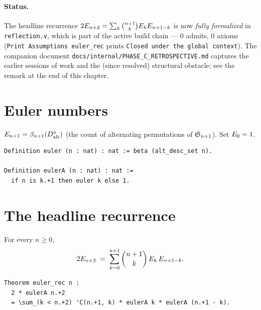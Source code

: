 \paragraph{Status.} The headline recurrence $2 E_{n+2} = \sum_k
\binom{n+1}{k} E_k E_{n+1-k}$ is now \emph{fully formalized}
in \texttt{reflection.v}, which is part of the active build chain
--- 0 admits, 0 axioms (\texttt{Print Assumptions euler\_rec}
prints \texttt{Closed under the global context}). The companion
document \texttt{docs/internal/PHASE\_C\_RETROSPECTIVE.md} captures
the earlier sessions of work and the (since resolved) structural
obstacle; see the remark at the end of this chapter.

\section{Euler numbers}

\begin{definition}
  $E_{n+1} = \beta_{n+1}(D_{\mathrm{alt}}^n)$ (the count of
  alternating permutations of $\mathfrak{S}_{n+1}$). Set $E_0 = 1$.
\end{definition}

\begin{lstlisting}[language=Rocq]
Definition euler (n : nat) : nat := beta (alt_desc_set n).

Definition eulerA (n : nat) : nat :=
  if n is k.+1 then euler k else 1.
\end{lstlisting}

\section{The headline recurrence}

\begin{theorem}
  For every $n \geq 0$,
  \[
    2 E_{n+2} \;=\; \sum_{k=0}^{n+1} \binom{n+1}{k} \, E_k \, E_{n+1-k}.
  \]
\end{theorem}

\begin{lstlisting}[language=Rocq]
Theorem euler_rec n :
  2 * eulerA n.+2
  = \sum_(k < n.+2) 'C(n.+1, k) * eulerA k * eulerA (n.+1 - k).
\end{lstlisting}

